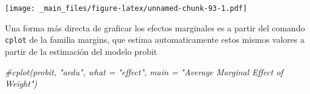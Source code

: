 \documentclass[
]{book}
\newenvironment{Shaded}{\begin{snugshade}}{\end{snugshade}}
\newcommand{\CommentTok}[1]{\textcolor[rgb]{0.56,0.35,0.01}{\textit{#1}}}
\begin{document}
\texttt{[image: \_main\_files/figure-latex/unnamed-chunk-93-1.pdf]}

Una forma más directa de graficar los efectos marginales es a partir del comando \texttt{cplot} de la familia margins, que estima automaticamente estos mismos valores a partir de la estimación del modelo probit

\begin{Shaded}
\begin{Highlighting}[]
\CommentTok{\#cplot(probit, "aedu", what = "effect", main = "Average Marginal Effect of Weight")}
\end{Highlighting}
\end{Shaded}


  
\end{document}
